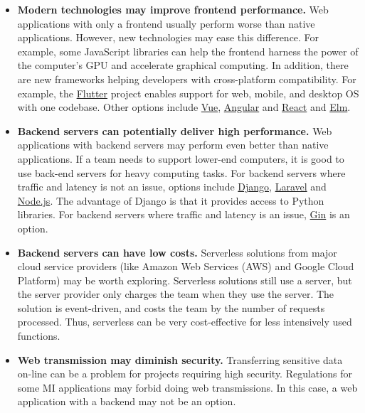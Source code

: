\documentclass[final, 3p, times, authoryear]{elsarticle}
\begin{document}
\begin{itemize}

\item \textbf{Modern technologies may improve frontend performance.} Web
applications with only a frontend usually perform worse than native
applications. However, new technologies may ease this difference. For example,
some JavaScript libraries can help the frontend harness the power of the
computer's GPU and accelerate graphical computing. In addition, there are new
frameworks helping developers with cross-platform compatibility. For example,
the \href{https://flutter.dev/}{Flutter} project enables support for web,
mobile, and desktop OS with one codebase.  Other options include
\href{https://vuejs.org/} {Vue}, \href{https://angular.io/} {Angular} and
\href{https://reactjs.org/} {React} and \href{https://elm-lang.org/}{Elm}.  

\item \textbf{Backend servers can potentially deliver high performance.} Web
applications with backend servers may perform even better than native
applications. If a team needs to support lower-end computers, it is good to use
back-end servers for heavy computing tasks.  For backend servers where traffic
and latency is not an issue, options include
\href{https://www.django-rest-framework.org/} {Django}, \href{https://laravel.com/} {Laravel} and
\href{https://nodejs.org/en/} {Node.js}.  The advantage of Django is that it provides access to Python
libraries.  For backend servers where traffic and latency is an issue,
\href{https://github.com/gin-gonic/gin} {Gin} is an option.

\item \textbf{Backend servers can have low costs.} Serverless solutions from
major cloud service providers (like Amazon Web Services (AWS) and Google Cloud
Platform) may be worth exploring. Serverless solutions still use a server, but
the server provider only charges the team when they use the server. The solution
is event-driven, and costs the team by the number of requests processed. Thus,
serverless can be very cost-effective for less intensively used functions.

\item \textbf{Web transmission may diminish security.} Transferring sensitive
data on-line can be a problem for projects requiring high security. Regulations
for some MI applications may forbid doing web transmissions. In this case, a web
application with a backend may not be an option.

\end{itemize}
\end{document}
